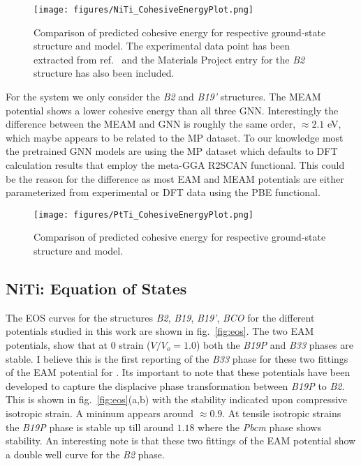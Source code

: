 \documentclass[preprint,colorlinks=true,linkcolor=black,citecolor=black]{elsarticle}
\begin{document}
\begin{figure}[ht!]
	\begin{centering}
		\texttt{[image: figures/NiTi\_CohesiveEnergyPlot.png]}
		\caption{ Comparison of predicted  cohesive energy for
			respective ground-state structure and model. The experimental
			data point has been extracted from ref.~\cite{Vandermause2024}
			and the Materials Project entry for the  \textit{B2}
			structure \cite{MP--571} has also been included.  }
		\label{fig:ecoh_niti}
	\end{centering}
\end{figure}

For the  system we only consider the \textit{B2} and
\textit{B19'} structures. The MEAM potential shows a lower cohesive
energy than all three GNN. Interestingly the difference between the
MEAM and GNN is roughly the same order, $\approx 2.1$ eV, which maybe
appears to be related to the MP dataset. To our knowledge most the
pretrained GNN models are using the MP dataset which defaults to DFT
calculation results that employ the meta-GGA R2SCAN functional. This
could be the reason for the difference as most EAM and MEAM potentials
are either parameterized from experimental or DFT data using the PBE
functional\cite{Mutter2010,Ko2015}. \par

\begin{figure}[ht!]
	\script{PlotCohesiveEnergy.py}
	\begin{centering}
		\texttt{[image: figures/PtTi\_CohesiveEnergyPlot.png]}
		\caption{ Comparison of predicted  cohesive energy for
			respective ground-state structure and model.  }
		\label{fig:ecoh_ptti}
	\end{centering}
\end{figure}

\subsection{NiTi: Equation of States}
\label{subsec:nitieos}

The EOS curves for the  structures \textit{B2}, \textit{B19},
\textit{B19'}, \textit{BCO} for the different potentials studied in
this work are shown in fig.~\ref{fig:eos}. The two EAM potentials,
show that at 0 strain ($V/V_o = 1.0$) both the \textit{B19P} and
\textit{B33} phases are stable. I believe this is the first reporting
of the \textit{B33} phase for these two fittings of the EAM potential
for . Its important to note that these potentials have been
developed to capture the displacive phase transformation between
\textit{B19P} to \textit{B2}. This is shown in fig.~\ref{fig:eos}(a,b)
with the stability indicated upon compressive isotropic strain. A
mininum appears around $\approx 0.9$. At tensile isotropic strains the
\textit{B19P} phase is stable up till around $1.18$ where the
\textit{Pbcm} phase shows stability. An interesting note is that these
two fittings of the EAM potential show a double well curve for the
\textit{B2} phase. \par
\end{document}
